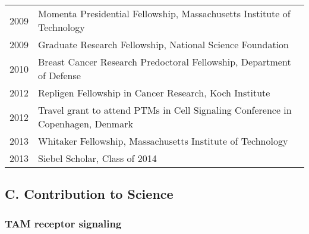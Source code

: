 \documentclass[11pt]{article}
\begin{document}
\begin{tabular}{p{1.1in}p{6.1in}}
 2009 & Momenta Presidential Fellowship, Massachusetts Institute of Technology\\
 2009 & Graduate Research Fellowship, National Science Foundation\\
 2010 & Breast Cancer Research Predoctoral Fellowship, Department of Defense\\
 2012 & Repligen Fellowship in Cancer Research, Koch Institute\\
 2012 & Travel grant to attend PTMs in Cell Signaling Conference in Copenhagen, Denmark\\
 2013 & Whitaker Fellowship, Massachusetts Institute of Technology\\
 2013 & Siebel Scholar, Class of 2014\\	
\end{tabular}





\subsection{C. Contribution to Science}




\subsubsection{TAM receptor signaling}
\end{document}
